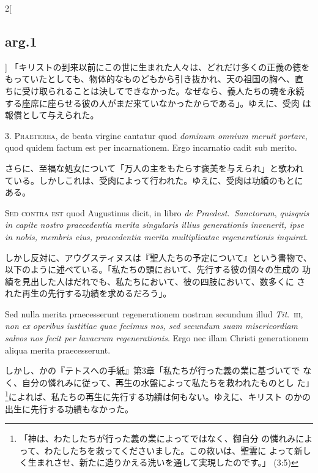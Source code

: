 \documentclass[paper=a4paper,fontsize=10pt,jafontsize=9pt,titlepage]{jlreq}
\begin{document}
\begin{paracol}{2}[\subsection{arg.1}]
「キリストの到来以前にこの世に生まれた人々は、どれだけ多くの正義の徳を
もっていたとしても、物体的なものどもから引き抜かれ、天の祖国の胸へ、直
ちに受け取られることは決してできなかった。なぜなら、義人たちの魂を永続
する座席に座らせる彼の人がまだ来ていなかったからである」。ゆえに、受肉
は報償として与えられた。


3. {\scshape Praeterea}, de beata virgine cantatur quod {\itshape
dominum omnium meruit portare}, quod quidem factum est per
incarnationem. Ergo incarnatio cadit sub merito.

\switchcolumn

さらに、至福な処女について「万人の主をもたらす褒美を与えられ」と歌われ
ている。しかしこれは、受肉によって行われた。ゆえに、受肉は功績のもとに
ある。

\switchcolumn*[\subsection{s.c.}]

{\scshape Sed contra est} quod Augustinus dicit, in libro {\itshape de
Praedest.~Sanctorum}, {\itshape quisquis in capite nostro praecedentia
merita singularis illius generationis invenerit, ipse in nobis,
membris eius, praecedentia merita multiplicatae regenerationis
inquirat}.

\switchcolumn

しかし反対に、アウグスティヌスは『聖人たちの予定について』という書物で、
以下のように述べている。「私たちの頭において、先行する彼の個々の生成の
功績を見出した人はだれでも、私たちにおいて、彼の四肢において、数多くに
された再生の先行する功績を求めるだろう」。

\switchcolumn*

Sed nulla merita praecesserunt regenerationem nostram secundum illud
{\itshape Tit}.~{\scshape iii}, {\itshape non ex operibus iustitiae
quae fecimus nos, sed secundum suam misericordiam salvos nos fecit per
lavacrum regenerationis}. Ergo nec illam Christi generationem aliqua
merita praecesserunt.

\switchcolumn

しかし、かの『テトスへの手紙』第3章「私たちが行った義の業に基づいてで
なく、自分の憐れみに従って、再生の水盤によって私たちを救われたものとし
た」\footnote{「神は、わたしたちが行った義の業によってではなく、御自分
の憐れみによって、わたしたちを救ってくださいました。この救いは、聖霊に
よって新しく生まれさせ、新たに造りかえる洗いを通して実現したのです。」
(3:5)}によれば、私たちの再生に先行する功績は何もない。ゆえに、キリスト
のかの出生に先行する功績もなかった。


\end{paracol}
\end{document}
